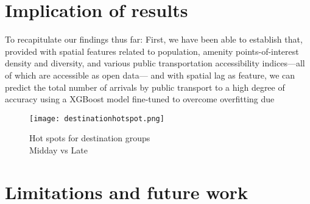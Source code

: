
\pagebreak
\section{Implication of results}

To recapitulate our findings thus far: First, we have been able to establish that, provided with spatial features related to population, amenity points-of-interest density and diversity, and various public transportation accessibility indices---all of which are accessible as open data--- and with spatial lag as feature, we can predict the total number of arrivals by public transport to a high degree of accuracy using a XGBoost model fine-tuned to overcome overfitting due 

\begin{figure}[!ht]
    \centering
    \texttt{[image: destinationhotspot.png]}
    \captionsetup{justification=centering}
    \caption{Hot spots for destination groups\\ Midday vs Late}
    \label{fig:destinationhotspot}
\end{figure}




\section{Limitations and future work}
